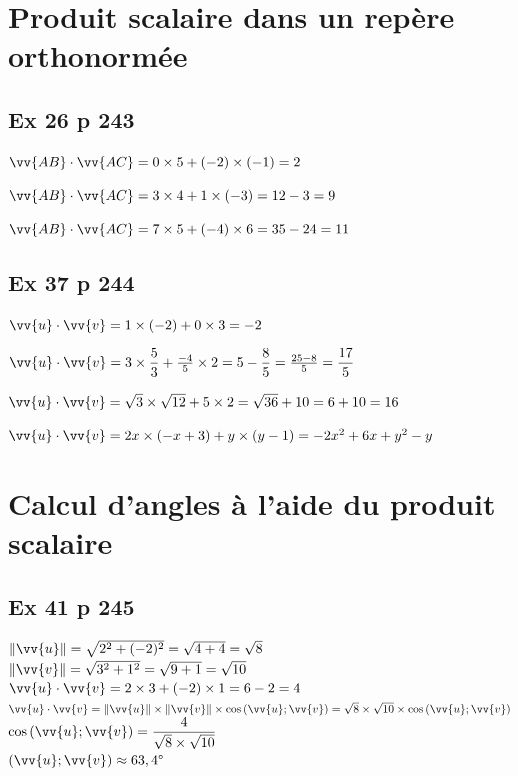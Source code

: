 \documentclass[12pt,a4paper]{book}
\begin{document}
\section*{Produit scalaire dans un repère orthonormée}

\subsection*{Ex 26 p 243}
\begin{enumMet}
    \item $\vv{A B} \cdot \vv{A C}=0 \times 5+(-2) \times(-1)=2$
    \item $\vv{A B} \cdot \vv{A C}=3 \times 4+1 \times(-3)=12-3=9$
    \item $\vv{A B} \cdot \vv{A C}=7 \times 5+(-4) \times 6=35-24=11$
\end{enumMet}

\subsection*{Ex 37 p 244}
\begin{enumMet}
    \item $ \vv{u} \cdot  \vv{v}=1 \times(-2)+0 \times 3=-2$
    \item $ \vv{u} \cdot  \vv{v}=3 \times \dfrac{5}{3}+\frac{-4}{5} \times 2=5-\dfrac{8}{5}=\frac{25-8}{5}=\dfrac{17}{5}$
    \item $ \vv{u} \cdot  \vv{v}=\sqrt{3} \times \sqrt{12}+5 \times 2=\sqrt{36}+10=6+10=16$
    \item $ \vv{u} \cdot  \vv{v}=2 x \times(-x+3)+y \times(y-1)=-2 x^{2}+6 x+y^{2}-y$
\end{enumMet}

\section*{Calcul d'angles à l'aide du produit scalaire}

\subsection*{Ex 41 p 245}
$\| \vv{u}\|=\sqrt{2^{2}+(-2)^{2}}=\sqrt{4+4}=\sqrt{8}$\\
$\| \vv{v}\|=\sqrt{3^{2}+1^{2}}=\sqrt{9+1}=\sqrt{10}$\\
$ \vv{u} \cdot  \vv{v}=2 \times 3+(-2) \times 1=6-2=4$\\
$\vv{u} \cdot \vv{v}=\|\vv{u}\| \times\|\vv{v}\| \times \cos \left(\vv{u};\vv{v}\right)=\sqrt{8}\times\sqrt{10}\times\cos \left(\vv{u};\vv{v}\right)$\\
$\cos \left(\vv{u};\vv{v}\right)=\dfrac{4}{\sqrt{8}\times\sqrt{10}}$\\
$\left(\vv{u};\vv{v}\right)\approx63,4\degree$
\end{document}
